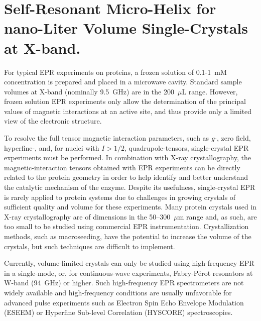 \chapter[Self-Resonant Micro-Helix at X-band]{Self-Resonant Micro-Helix for nano-Liter Volume Single-Crystals at X-band.}

For typical EPR experiments on proteins, a frozen solution of 0.1-1~mM concentration is prepared and placed in a microwave cavity. Standard sample volumes at X-band (nominally 9.5~GHz) are in the 200~$\mu$L range. However, frozen solution EPR experiments only allow the determination of the principal values of magnetic interactions at an active site, and thus provide only a limited view of the electronic structure. \cite{schweiger2001principles, goldfarb2018epr}

To resolve the full tensor magnetic interaction parameters, such as \textit{g}-, zero field, hyperfine-, and, for nuclei with $I>1/2$, quadrupole-tensors, single-crystal EPR experiments must be performed. In combination with X-ray crystallography, the magnetic-interaction tensors obtained with EPR experiments can be directly related to the protein geometry in order to help identify and better understand the catalytic mechanism of the enzyme. \cite{Bowman2016, NiFeRev2007} Despite its usefulness, single-crystal EPR is rarely applied to protein systems due to challenges in growing crystals of sufficient quality and volume for these experiments. Many protein crystals used in X-ray crystallography are of dimensions in the 50--300~$\mu$m range and, as such, are too small to be studied using commercial EPR instrumentation. Crystallization methods, such as macroseeding,\cite{macroseeding} have the potential to increase the volume of the crystals, but such techniques are difficult to implement. 

Currently, volume-limited crystals can only be studied using high-frequency EPR in a single-mode\cite{Hofbauer6623}, or, for continuous-wave experiments, Fabry-P\'{e}rot\cite{Klette94GHzPSI} resonators at W-band (94~GHz) or higher. Such high-frequency EPR spectrometers are not widely available and high-frequency conditions are usually unfavorable for advanced pulse experiments such as Electron Spin Echo Envelope Modulation (ESEEM) or Hyperfine Sub-level Correlation (HYSCORE) spectroscopies. \cite{pulseseq}

